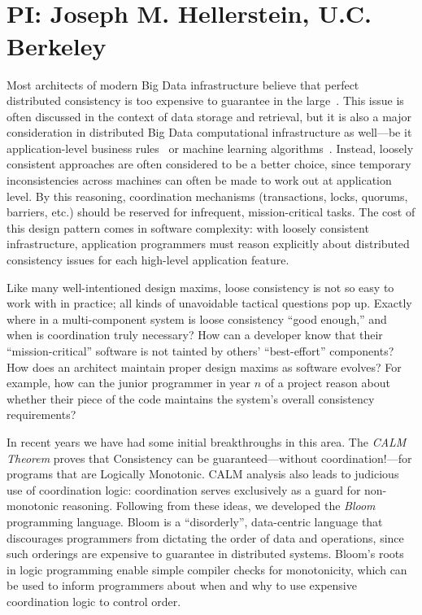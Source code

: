 \vspace{-2pt}
\section*{\mytitle\\
{\normalsize PI: Joseph M. Hellerstein, U.C. Berkeley}}
Most architects of modern Big Data infrastructure believe that perfect distributed consistency is too expensive to guarantee in the large~\cite{ladisreport}.  This issue is often discussed in the context of data storage and retrieval, but it is also a major consideration in distributed Big Data computational infrastructure as well---be it application-level business rules~\cite{finkelstein2011} or machine learning algorithms~\cite{hogwild}.  Instead, loosely consistent approaches are often considered to be a better choice, since temporary inconsistencies across machines can often be made to work out at application level. By this reasoning, coordination mechanisms (transactions, locks, quorums, barriers, etc.) should be reserved for infrequent, mission-critical tasks.  The cost of this design pattern comes in software complexity: with loosely consistent infrastructure, application programmers must reason explicitly about distributed consistency issues for each high-level application feature.

Like many well-intentioned design maxims, loose consistency is not so easy to work with in practice; all kinds of unavoidable tactical questions pop up.  Exactly where in a multi-component system is loose consistency ``good enough,'' and when is coordination truly necessary?  How can a developer know that their ``mission-critical'' software is not tainted by others' ``best-effort'' components?  How does an architect maintain proper design maxims as software evolves? For example, how can the junior programmer in year $n$ of a project reason about whether their piece of the code maintains the system's overall consistency requirements?

In recent years we have had some initial breakthroughs in this area.  The \emph{CALM Theorem} proves that Consistency can be guaranteed---without coordination!---for programs that are Logically Monotonic. CALM analysis also leads to judicious use of coordination logic: coordination serves exclusively as a guard for non-monotonic reasoning.  Following from these ideas, we developed the \emph{Bloom} programming language.  Bloom is a ``disorderly'', data-centric language that discourages programmers from dictating the order of data and operations, since such orderings are expensive to guarantee in distributed systems.  Bloom's roots in logic programming enable simple compiler checks for monotonicity, which can be used to inform programmers about when and why to use expensive coordination logic to control order.

